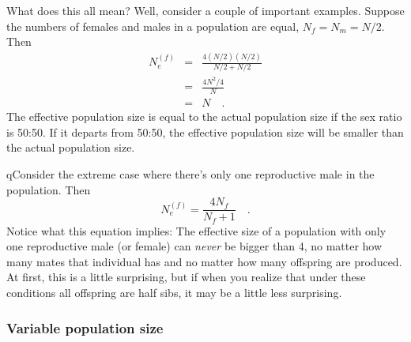 What does this all mean? Well, consider a couple of important
examples. Suppose the numbers of females and males in a population are
equal, $N_f = N_m = N/2$. Then
\begin{eqnarray*}
N_e^{(f)} &=& \frac{4(N/2)(N/2)}{N/2 + N/2} \\
          &=& \frac{4N^2/4}{N} \\
          &=& N \quad .
\end{eqnarray*}
The effective population size is equal to the actual population size
if the sex ratio is 50:50. If it departs from 50:50, the effective
population size will be smaller than the actual population
size.

qConsider the extreme case where there's only one reproductive
male in the population. Then
\begin{equation}
N_e^{(f)} = \frac{4N_f}{N_f + 1} \quad . \label{eq:ne-harem}
\end{equation}
Notice what this equation implies: The effective size of a population
with only one reproductive male (or female) can {\it never\/} be
bigger than 4, no matter how many mates that individual has and no
matter how many offspring are produced. At first, this is a little
surprising, but if when you realize that under these conditions all
offspring are half sibs, it may be a little less surprising.

\subsubsection*{Variable population size}

